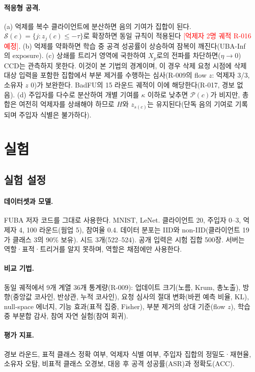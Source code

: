 \documentclass[10pt,a4paper]{article}
\newcommand{\todo}[1]{\textcolor{red}{[#1]}}
\newcommand{\method}{CCD}
\begin{document}
\paragraph{적응형 공격.} (a) 억제를 복수 클라이언트에 분산하면 음의 기여가 집합이 된다. $\mathcal{S}(c)=\{j:z_j(c)\le-\tau\}$로 확장하면 동일 규칙이 적용된다 \todo{억제자 2명 궤적 R-016 예정}. (b) 억제를 약화하면 학습 중 공격 성공률이 상승하여 잠복이 깨진다(UBA-Inf의 exposure). (c) 상쇄를 트리거 영역에 국한하여 $X_p$로의 전파를 차단하면($\eta\to0$) \method{}는 관측하지 못한다. 이것이 본 기법의 경계이며, 이 경우 삭제 요청 시점에 삭제 대상 입력을 포함한 집합에서 부분 제거를 수행하는 심사(R-009의 flow $z$: 억제자 3/3, 소유자 $z$ 0)가 보완한다. BadFU의 15 라운드 궤적이 이에 해당한다(R-017, 경보 없음). (d) 주입자를 다수로 분산하여 개별 기여를 $\kappa$ 이하로 낮추면 $\mathcal{P}(c)$가 비지만, 총합은 여전히 억제자를 상쇄해야 하므로 $H$와 $z_{s(c)}$는 유지된다(단독 음의 기여로 기록되며 주입자 식별은 불가하다).

\section{실험}\label{sec:eval}
\subsection{실험 설정}
\paragraph{데이터셋과 모델.} FUBA 저자 코드를 그대로 사용한다. MNIST, LeNet. 클라이언트 20, 주입자 0--3, 억제자 4, 100 라운드(웜업 5), 참여율 0.4. 데이터 분포는 IID와 non-IID(클라이언트 19가 클래스 3의 90\% 보유). 시드 3개(522--524). 공개 입력은 시험 집합 500장. 서버는 역할·표적·트리거를 알지 못하며, 역할은 채점에만 사용한다.
\paragraph{비교 기법.} 동일 궤적에서 9개 계열 36개 통계량(R-009): 업데이트 크기(노름, Krum, 총노출), 방향(중앙값 코사인, 반상관, 누적 코사인), 요청 심사의 절대 변화(바뀐 예측 비율, KL), null-space 에너지, 기능 효과(표적 집중, Fisher), 부분 제거의 상대 기준(flow $z$), 학습 중 부분합 감사, 참여 자연 실험(참여 회귀).
\paragraph{평가 지표.} 경보 라운드, 표적 클래스 정확 여부, 억제자 식별 여부, 주입자 집합의 정밀도·재현율, 소유자 오탐, 비표적 클래스 오경보, 대응 후 공격 성공률(ASR)과 정확도(ACC).
\end{document}
